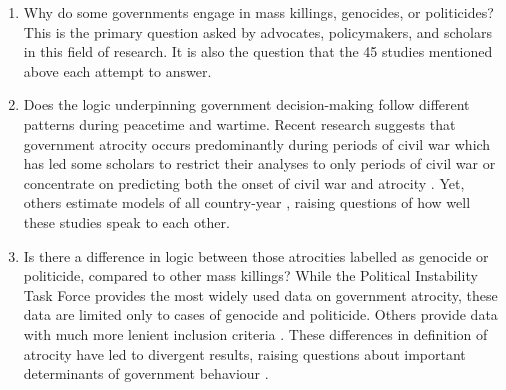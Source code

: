 \begin{enumerate}
    \item Why do some governments engage in mass killings, genocides, or politicides? This is the primary question asked by advocates, policymakers, and scholars in this field of research. It is also the question that the 45 studies mentioned above each attempt to answer.
    \item Does the logic underpinning government decision-making follow different patterns during peacetime and wartime. Recent research suggests that government atrocity occurs predominantly during periods of civil war \citep{harff2003no} which has led some scholars to restrict their analyses to only periods of civil war \citep[e.g.,][]{colaresi2008kill, valentino2004draining} or concentrate on predicting both the onset of civil war and atrocity \citep{goldsmith2013forecasting}. Yet, others estimate models of all country-year \citep[e.g.,][]{krain1997state, montalvo2008discrete}, raising questions of how well these studies speak to each other.
    \item Is there a difference in logic between those atrocities labelled as genocide or politicide, compared to other mass killings? While the Political Instability Task Force \citep{marshall2017pitf} provides the most widely used data on government atrocity, these data are limited only to cases of genocide and politicide. Others provide data with much more lenient inclusion criteria \citep[e.g.,][]{eck2007one, rummel1995democracy, stanton2015regulating, ulfelder2012forecasting}. These differences in definition of atrocity have led to divergent results, raising questions about important determinants of government behaviour \citep[for discussion, see][]{uzonyi2016domestic, wayman2010explaining}.
\end{enumerate}

